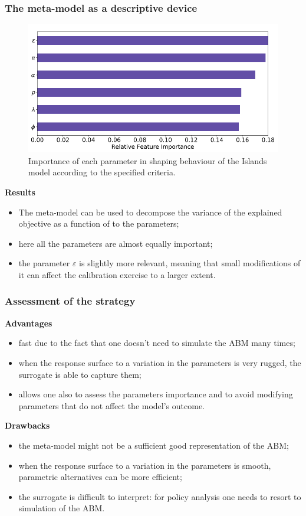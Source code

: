 \documentclass[10pt]{beamer}
\begin{document}
\begin{frame}[c]\frametitle{The meta-model as a descriptive device}
    \begin{figure} \centering
    	\includegraphics[scale=.25]{figures/lamperti_2018_featureimportance.png}
    	\caption{Importance of each parameter in shaping behaviour of the Islands model according to the specified criteria.}
    \end{figure}

    \alert{\textbf{Results}}
    \begin{itemize}
    	\item The meta-model can be used to decompose the variance of the explained objective as a function of to the parameters;
    	\item here all the parameters are almost equally important;
    	\item the parameter $\varepsilon$ is slightly more relevant, meaning that small modifications of it can affect the calibration exercise to a larger extent.
    \end{itemize}
\end{frame}


\begin{frame}[c]\frametitle{Assessment of the strategy}
    \alert{\textbf{Advantages}}
    \begin{itemize}
    	\item fast due to the fact that one doesn't need to simulate the ABM many times;
		\item when the response surface to a variation in the parameters is very rugged, the surrogate is able to capture them;
		\item allows one also to assess the parameters importance and to avoid modifying parameters that do not affect the model's outcome.
    \end{itemize} \bigskip
    
    \alert{\textbf{Drawbacks}}
    \begin{itemize}
    	\item the meta-model might not be a sufficient good representation of the ABM;
    	\item when the response surface to a variation in the parameters is smooth, parametric alternatives can be more efficient;
    	\item the surrogate is difficult to interpret: for policy analysis one needs to resort to simulation of the ABM.
    \end{itemize}
\end{frame}
\end{document}
